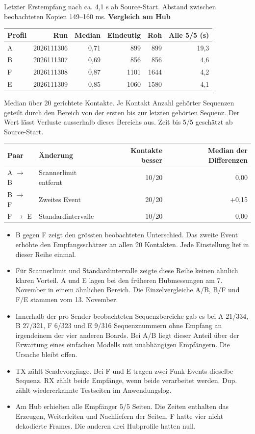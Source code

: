 \documentclass[a4paper,11pt]{article}
\begin{document}
{\small Letzter Erstempfang nach ca. 4,1 s ab Source-Start. Abstand zwischen beobachteten Kopien 149--160 ms.}
\newpage
\textbf{Vergleich am Hub}

\begin{center}
\small
\begin{tabular}{lrrrrr}\toprule
Profil & Run & Median & Eindeutig & Roh & Alle 5/5 (s) \\ \midrule
A & 2026111306 & 0,71 & 899 & 899 & 19,3 \\
B & 2026111307 & 0,69 & 856 & 856 & 4,6 \\
F & 2026111308 & 0,87 & 1101 & 1644 & 4,2 \\
E & 2026111309 & 0,85 & 1060 & 1580 & 4,1 \\
\bottomrule\end{tabular}
\end{center}

{\small Median über 20 gerichtete Kontakte. Je Kontakt Anzahl gehörter Sequenzen geteilt durch den Bereich von der ersten bis zur letzten gehörten Sequenz. Der Wert lässt Verluste ausserhalb dieses Bereichs aus. Zeit bis 5/5 geschätzt ab Source-Start.}

\begin{center}
\small
\begin{tabular}{llrr}\toprule
Paar & Änderung & Kontakte besser & Median der Differenzen \\ \midrule
A $\to$ B & Scannerlimit entfernt & 10/20 & 0,00 \\
B $\to$ F & Zweites Event & 20/20 & +0,15 \\
F $\to$ E & Standardintervalle & 10/20 & 0,00 \\
\bottomrule\end{tabular}
\end{center}

\begin{itemize}
\item B gegen F zeigt den grössten beobachteten Unterschied. Das zweite Event erhöhte den Empfangsschätzer an allen 20 Kontakten. Jede Einstellung lief in dieser Reihe einmal.
\item Für Scannerlimit und Standardintervalle zeigte diese Reihe keinen ähnlich klaren Vorteil. A und E lagen bei den früheren Hubmessungen am 7. November in einem ähnlichen Bereich. Die Einzelvergleiche A/B, B/F und F/E stammen vom 13. November.
\item Innerhalb der pro Sender beobachteten Sequenzbereiche gab es bei A 21/334, B 27/321, F 6/323 und E 9/316 Sequenznummern ohne Empfang an irgendeinem der vier anderen Boards. Bei A/B liegt dieser Anteil über der Erwartung eines einfachen Modells mit unabhängigen Empfängern. Die Ursache bleibt offen.
\item TX zählt Sendevorgänge. Bei F und E tragen zwei Funk-Events dieselbe Sequenz. RX zählt beide Empfänge, wenn beide verarbeitet werden. Dup. zählt wiedererkannte Testseiten im Anwendungslog.
\item Am Hub erhielten alle Empfänger 5/5 Seiten. Die Zeiten enthalten das Erzeugen, Weiterleiten und Nachliefern der Seiten. F hatte vier nicht dekodierte Frames. Die anderen drei Hubprofile hatten null.
\end{itemize}
\end{document}
